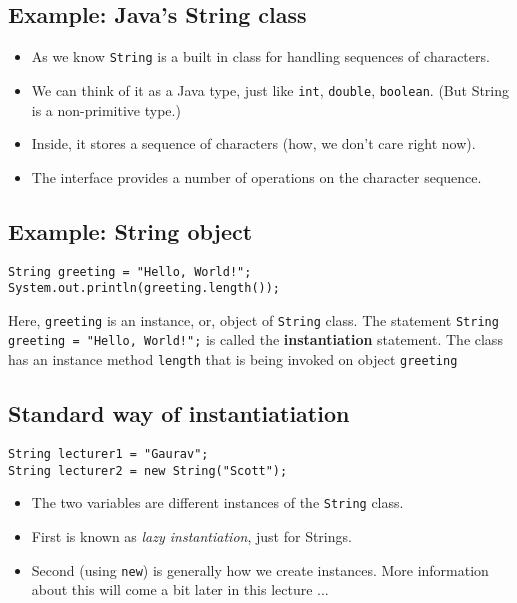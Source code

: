 \documentclass[abstracton]{scrartcl}
\begin{document}
\subsection{Example: Java's String class}

  \begin{itemize}
  \item As we know \lstinline!String! is a built in class for handling sequences
    of characters.
  \item We can think of it as a Java type, just like \lstinline!int!,
    \lstinline!double!, \lstinline!boolean!. (But String is a non-primitive
type.)
  \item Inside, it stores a sequence of characters (how, we don't
    care right now).
  \item The interface provides a number of operations on the character
    sequence.
  \end{itemize}

\subsection{Example: String object}

\begin{lstlisting}
String greeting = "Hello, World!";
System.out.println(greeting.length());
\end{lstlisting}
Here, \texttt{greeting} is an instance, or, object of \texttt{String} class. The statement \texttt{String greeting = "Hello, World!";} is called the \textbf{instantiation} statement. The class has an instance method \texttt{length} that is being invoked on object \texttt{greeting}

\subsection{Standard way of instantiatiation}

\begin{lstlisting}
String lecturer1 = "Gaurav";
String lecturer2 = new String("Scott");
\end{lstlisting}
  \begin{itemize}
  \item The two variables are different instances of the
    \lstinline!String! class.
  \item First is known as \emph{lazy instantiation}, just for Strings.
  \item Second (using \lstinline!new!) is generally how we create instances.
        More information about this will come a bit later in this lecture ...
  \end{itemize}
\end{document}
